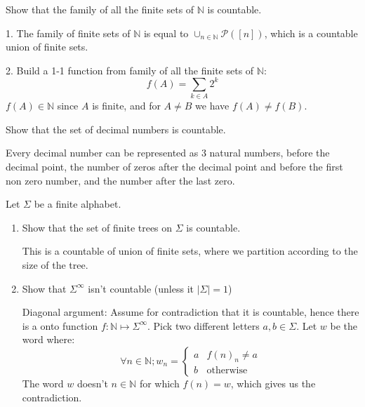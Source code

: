 \documentclass[a4paper,11pt]{exam}
\newcommand{\N}{\mathbb{N}}
\begin{document}
\begin{questions}
  \question
  Show that the family of all the finite sets of $\N$ is countable.

  \begin{solution}
  	1. The family of finite  sets of $\N$ is equal to $ \cup_{n\in\N }\mathcal{P}([n])	$, which is a countable union of finite sets.
  	
  	2. Build a 1-1 function from family of all the finite sets of $\N$: 
  	\[
  		f(A) = \sum_{k\in A} 2^k
  	\] 
   	$ f(A)\in \N$ since $A$  is finite, and for $ A\neq B $ we have $f(A)\neq f(B)$.
  \end{solution}

  \question
  Show that the set of decimal numbers is countable.

  \begin{solution}
  	Every decimal number can be represented as 3 natural numbers, before the decimal point, the number of zeros after the decimal point and before the first non zero number, and the number after the last zero.

  \end{solution}

  \question
  Let $\Sigma$ be a finite alphabet.
  \begin{enumerate}
    \item Show that the set of finite trees on $\Sigma$ is countable.
   

      \begin{solution}
        This is a countable of union of finite sets, where we partition according to the size of the tree.
      \end{solution}

    \item Show that $\Sigma^\infty$ isn't countable (unless it $|\Sigma| = 1$)

      \begin{solution}
      	Diagonal argument: Assume for contradiction that it is countable, hence there is a onto function $f:\N\mapsto \Sigma^\infty$. Pick two different letters $a,b\in\Sigma$. 
      	Let $w$ be the word where:
      	\[
      		\forall n\in\N;w_{n}=\begin{cases}
      		a & f(n)_{n}\neq a\\
      		b & \text{otherwise}
      		\end{cases}
      	\] 
      	The word $w$ doesn't  $n\in\N$ for which $f(n) = w$, which gives us the contradiction. 
      \end{solution}
  \end{enumerate}


\end{questions}
\end{document}

